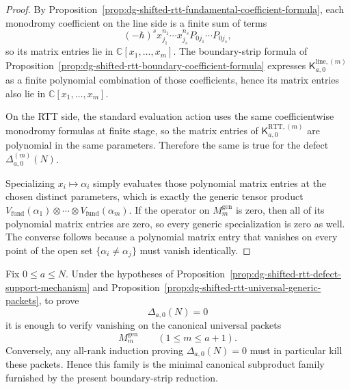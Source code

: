 \begin{proof}
By
Proposition~\ref{prop:dg-shifted-rtt-fundamental-coefficient-formula},
each monodromy coefficient on the line side is a finite sum of terms
\[
(-\hbar)^s x_{j_1}^{n_1}\cdots x_{j_s}^{n_s} P_{0j_1}\cdots P_{0j_s},
\]
so its matrix entries lie in $\mathbb{C}[x_1,\dots,x_m]$.  The
boundary-strip formula of
Proposition~\ref{prop:dg-shifted-rtt-boundary-coefficient-formula}
expresses $\mathsf{K}^{\mathrm{line},(m)}_{a,0}$ as a finite
polynomial combination of those coefficients, hence its matrix entries
also lie in $\mathbb{C}[x_1,\dots,x_m]$.

On the RTT side, the standard evaluation action uses the same
coefficientwise monodromy formulas at finite stage, so the matrix
entries of $\mathsf{K}^{\mathrm{RTT},(m)}_{a,0}$ are polynomial in the
same parameters.  Therefore the same is true for the defect
$\Delta^{(m)}_{a,0}(N)$.

Specializing $x_i\mapsto\alpha_i$ simply evaluates those polynomial
matrix entries at the chosen distinct parameters, which is exactly the
generic tensor product
$V_{\mathrm{fund}}(\alpha_1)\otimes\cdots\otimes
V_{\mathrm{fund}}(\alpha_m)$.  If the operator on
$M_m^{\mathrm{gen}}$ is zero, then all of its polynomial matrix entries
are zero, so every generic specialization is zero as well.  The
converse follows because a polynomial matrix entry that vanishes on
every point of the open set $\{\alpha_i\neq\alpha_j\}$ must vanish
identically.
\end{proof}

\begin{corollary}
\label{cor:dg-shifted-rtt-minimal-canonical-family}
Fix $0\le a\le N$.  Under the hypotheses of
Proposition~\ref{prop:dg-shifted-rtt-defect-support-mechanism} and
Proposition~\ref{prop:dg-shifted-rtt-universal-generic-packets}, to
prove
\[
\Delta_{a,0}(N)=0
\]
it is enough to verify vanishing on the canonical universal packets
\[
M_m^{\mathrm{gen}}
\qquad (1\le m\le a+1).
\]
Conversely, any all-rank induction proving $\Delta_{a,0}(N)=0$ must in
particular kill these packets.  Hence this family is the minimal
canonical subproduct family furnished by the present boundary-strip
reduction.
\end{corollary}

